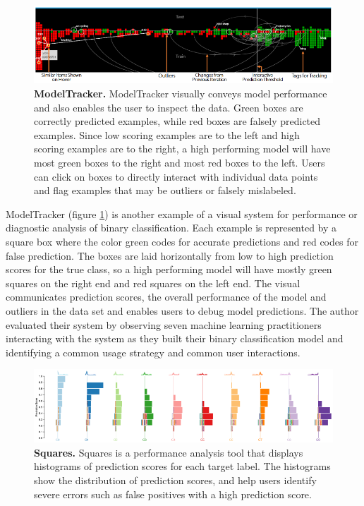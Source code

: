 \begin{figure}[h]
\centering
\includegraphics[width=1\textwidth]{ModelTracker}
\caption{\textbf{ModelTracker.} ModelTracker visually conveys model performance and also enables the user to inspect the data. Green boxes are correctly predicted examples, while red boxes are falsely predicted examples. Since low scoring examples are to the left and high scoring examples are to the right, a high performing model will have most green boxes to the right and most red boxes to the left. Users can click on boxes to directly interact with individual data points and flag examples that may be outliers or falsely mislabeled.  }\label{fig:ModelTracker}
\end{figure}

ModelTracker \cite{ModelTracker} (figure \ref{fig:ModelTracker}) is another example of a visual system for performance or diagnostic analysis of binary classification. Each example is represented by a square box where the color green codes for accurate predictions and red codes for false prediction. The boxes are laid horizontally from low to high prediction scores for the true class, so a high performing model will have mostly green squares on the right end and red squares on the left end. The visual communicates prediction scores, the overall performance of the model and outliers in the data set and enables users to debug model predictions. The author evaluated their system by observing seven machine learning practitioners interacting with the system as they built their binary classification model and identifying a common usage strategy and common user interactions. 

\begin{figure}[h]
\centering
\includegraphics[width=1\textwidth]{Squares}
\caption{\textbf{Squares.} Squares is a performance analysis tool that displays histograms of prediction scores for each target label. The histograms show the distribution of prediction scores, and help users identify severe errors such as false positives with a high prediction score. }\label{fig:Squares}
\end{figure}

